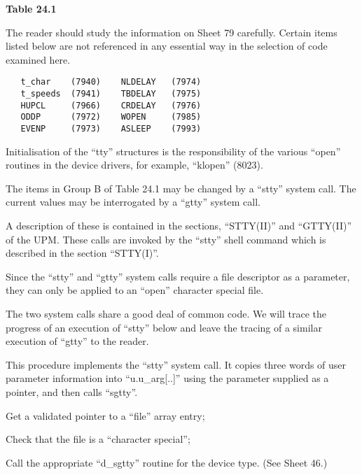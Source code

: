 \begin{center}
{\large \bf Table 24.1}
\end{center}


The reader should study the information
on Sheet 79 carefully. Certain items
listed below are not referenced in any
essential way in the selection of code
examined here.

\begin{verbatim}
   t_char    (7940)    NLDELAY   (7974)
   t_speeds  (7941)    TBDELAY   (7975)
   HUPCL     (7966)    CRDELAY   (7976)
   ODDP      (7972)    WOPEN     (7985)
   EVENP     (7973)    ASLEEP    (7993)
\end{verbatim}


Initialisation of the ``tty'' structures
is the responsibility of the various
``open'' routines in the device drivers,
for example, ``klopen'' (8023).

The items in Group B of Table 24.1 may
be changed by a ``stty'' system call.
The current values may be interrogated
by a ``gtty'' system call.

A description of these is contained in
the sections, ``STTY(II)'' and ``GTTY(II)''
of the UPM. These calls are invoked by
the ``stty'' shell command which is
described in the section ``STTY(I)''.

Since the ``stty'' and ``gtty'' system
calls require a file descriptor as a
parameter, they can only be applied to
an ``open'' character special file.

The two system calls share a good deal
of common code. We will trace the progress of an execution of ``stty'' below
and leave the tracing of a similar execution of ``gtty'' to the reader.


This procedure implements the ``stty''
system call. It copies three words of
user parameter information into
``u.u\_arg[..]'' using the parameter supplied as a pointer, and then calls
``sgtty''.


\bd
\item[8206:] Get a validated pointer to  a
``file'' array entry;

\item[8209:] Check that the file is a ``character special'';

\item[8213:] Call the appropriate ``d\_sgtty''
routine for the device type. (See
Sheet 46.)
\ed

